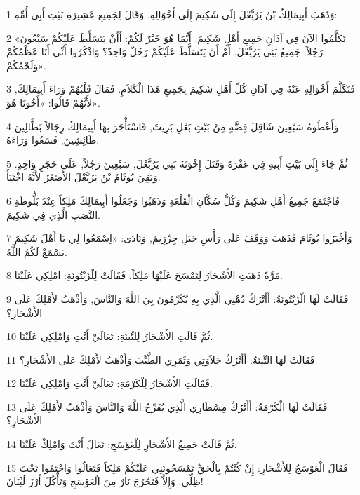 \par 1 وَذَهَبَ أَبِيمَالِكُ بْنُ يَرُبَّعْلَ إِلَى شَكِيمَ إِلَى أَخْوَالِهِ, وَقَالَ لِجَمِيعِ عَشِيرَةِ بَيْتِ أَبِي أُمِّهِ:
\par 2 «تَكَلَّمُوا الآنَ فِي آذَانِ جَمِيعِ أَهْلِ شَكِيمَ. أَيُّمَا هُوَ خَيْرٌ لَكُمْ: أَأَنْ يَتَسَلَّطَ عَلَيْكُمْ سَبْعُونَ رَجُلاً, جَمِيعُ بَنِي يَرُبَّعْلَ, أَمْ أَنْ يَتَسَلَّطَ عَلَيْكُمْ رَجُلٌ وَاحِدٌ؟ وَاذْكُرُوا أَنِّي أَنَا عَظْمُكُمْ وَلَحْمُكُمْ».
\par 3 فَتَكَلَّمَ أَخْوَالِهِ عَنْهُ فِي آذَانِ كُلِّ أَهْلِ شَكِيمَ بِجَمِيعِ هَذَا الْكَلاَمِ. فَمَالَ قَلْبُهُمْ وَرَاءَ أَبِيمَالِكَ, لأَنَّهُمْ قَالُوا: «أَخُونَا هُوَ».
\par 4 وَأَعْطُوهُ سَبْعِينَ شَاقِلَ فِضَّةٍ مِنْ بَيْتِ بَعْلِ بَرِيثَ, فَاسْتَأْجَرَ بِهَا أَبِيمَالِكُ رِجَالاً بَطَّالِينَ طَائِشِينَ, فَسَعُوا وَرَاءَهُ.
\par 5 ثُمَّ جَاءَ إِلَى بَيْتِ أَبِيهِ فِي عَفْرَةَ وَقَتَلَ إِخْوَتَهُ بَنِي يَرُبَّعْلَ, سَبْعِينَ رَجُلاً, عَلَى حَجَرٍ وَاحِدٍ. وَبَقِيَ يُوثَامُ بْنُ يَرُبَّعْلَ الأَصْغَرُ لأَنَّهُ اخْتَبَأَ.
\par 6 فَاجْتَمَعَ جَمِيعُ أَهْلِ شَكِيمَ وَكُلُّ سُكَّانِ الْقَلْعَةِ وَذَهَبُوا وَجَعَلُوا أَبِيمَالِكَ مَلِكاً عِنْدَ بَلُّوطَةِ النَّصَبِ الَّذِي فِي شَكِيمَ.
\par 7 وَأَخْبَرُوا يُوثَامَ فَذَهَبَ وَوَقَفَ عَلَى رَأْسِ جَبَلِ جِرِّزِيمَ, وَنَادَى: «اِسْمَعُوا لِي يَا أَهْلَ شَكِيمَ يَسْمَعْ لَكُمُ اللَّهُ.
\par 8 مَرَّةً ذَهَبَتِ الأَشْجَارُ لِتَمْسَحَ عَلَيْهَا مَلِكاً. فَقَالَتْ لِلّزَيْتُونَةِ: امْلِكِي عَلَيْنَا.
\par 9 فَقَالَتْ لَهَا الّزَيْتُونَةُ: أَأَتْرُكُ دُهْنِي الَّذِي بِهِ يُكَرِّمُونَ بِيَ اللَّهَ وَالنَّاسَ, وَأَذْهَبُ لأَمْلِكَ عَلَى الأَشْجَارِ؟
\par 10 ثُمَّ قَالَتِ الأَشْجَارُ لِلتِّينَةِ: تَعَالَيْ أَنْتِ وَامْلِكِي عَلَيْنَا.
\par 11 فَقَالَتْ لَهَا التِّينَةُ: أَأَتْرُكُ حَلاَوَتِي وَثَمَرِي الطَّيِّبَ وَأَذْهَبُ لأَمْلِكَ عَلَى الأَشْجَارِ؟
\par 12 فَقَالَتِ الأَشْجَارُ لِلْكَرْمَةِ: تَعَالَيْ أَنْتِ وَامْلِكِي عَلَيْنَا.
\par 13 فَقَالَتْ لَهَا الْكَرْمَةُ: أَأَتْرُكُ مِسْطَارِي الَّذِي يُفَرِّحُ اللَّهَ وَالنَّاسَ وَأَذْهَبُ لأَمْلِكَ عَلَى الأَشْجَارِ؟
\par 14 ثُمَّ قَالَتْ جَمِيعُ الأَشْجَارِ لِلْعَوْسَجِ: تَعَالَ أَنْتَ وَامْلِكْ عَلَيْنَا.
\par 15 فَقَالَ الْعَوْسَجُ لِلأَشْجَارِ: إِنْ كُنْتُمْ بِالْحَقِّ تَمْسَحُونَنِي عَلَيْكُمْ مَلِكاً فَتَعَالُوا وَاحْتَمُوا تَحْتَ ظِلِّي. وَإِلاَّ فَتَخْرُجَ نَارٌ مِنَ الْعَوْسَجِ وَتَأْكُلَ أَرْزَ لُبْنَانَ!
